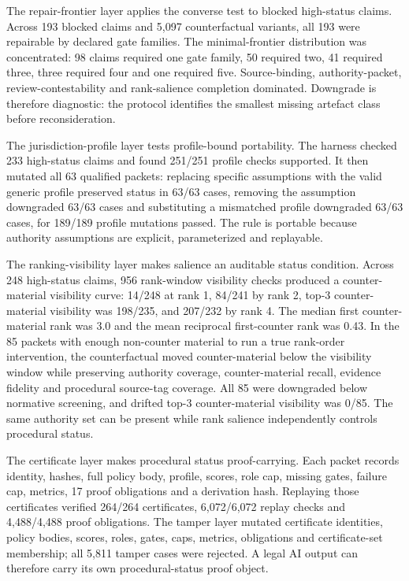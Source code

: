 \documentclass[12pt,a4paper]{article}
\begin{document}
The repair-frontier layer applies the converse test to blocked high-status claims. Across 193 blocked claims and 5,097 counterfactual variants, all 193 were repairable by declared gate families. The minimal-frontier distribution was concentrated: 98 claims required one gate family, 50 required two, 41 required three, three required four and one required five. Source-binding, authority-packet, review-contestability and rank-salience completion dominated. Downgrade is therefore diagnostic: the protocol identifies the smallest missing artefact class before reconsideration.

The jurisdiction-profile layer tests profile-bound portability. The harness checked 233 high-status claims and found 251/251 profile checks supported. It then mutated all 63 qualified packets: replacing specific assumptions with the valid generic profile preserved status in 63/63 cases, removing the assumption downgraded 63/63 cases and substituting a mismatched profile downgraded 63/63 cases, for 189/189 profile mutations passed. The rule is portable because authority assumptions are explicit, parameterized and replayable.

The ranking-visibility layer makes salience an auditable status condition. Across 248 high-status claims, 956 rank-window visibility checks produced a counter-material visibility curve: 14/248 at rank 1, 84/241 by rank 2, top-3 counter-material visibility was 198/235, and 207/232 by rank 4. The median first counter-material rank was 3.0 and the mean reciprocal first-counter rank was 0.43. In the 85 packets with enough non-counter material to run a true rank-order intervention, the counterfactual moved counter-material below the visibility window while preserving authority coverage, counter-material recall, evidence fidelity and procedural source-tag coverage. All 85 were downgraded below normative screening, and drifted top-3 counter-material visibility was 0/85. The same authority set can be present while rank salience independently controls procedural status.

The certificate layer makes procedural status proof-carrying. Each packet records identity, hashes, full policy body, profile, scores, role cap, missing gates, failure cap, metrics, 17 proof obligations and a derivation hash. Replaying those certificates verified 264/264 certificates, 6,072/6,072 replay checks and 4,488/4,488 proof obligations. The tamper layer mutated certificate identities, policy bodies, scores, roles, gates, caps, metrics, obligations and certificate-set membership; all 5,811 tamper cases were rejected. A legal AI output can therefore carry its own procedural-status proof object.
\end{document}
